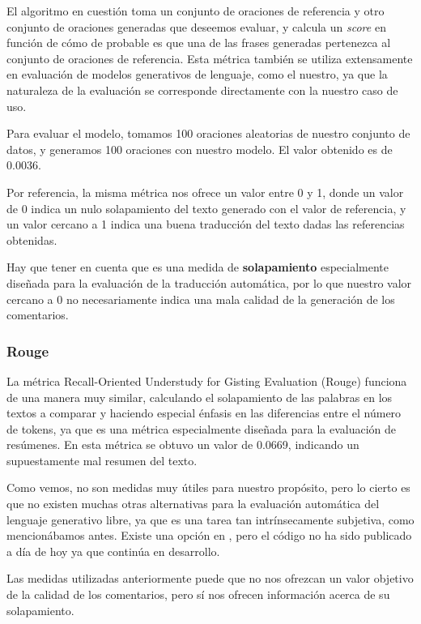 El algoritmo en cuestión toma un conjunto de oraciones de referencia y otro conjunto de oraciones generadas que deseemos evaluar, y calcula un \textit{score} en función de cómo de probable es que una de las frases generadas pertenezca al conjunto de oraciones de referencia. Esta métrica también se utiliza extensamente en evaluación de modelos generativos de lenguaje, como el nuestro, ya que la naturaleza de la evaluación se corresponde directamente con la nuestro caso de uso.


Para evaluar el modelo, tomamos 100 oraciones aleatorias de nuestro conjunto de datos, y generamos 100 oraciones con nuestro modelo. El valor obtenido es de 0.0036. 

Por referencia, la misma métrica nos ofrece un valor entre 0 y 1, donde un valor de 0 indica un nulo solapamiento del texto generado con el valor de referencia, y un valor cercano a 1 indica una buena traducción del texto dadas las referencias obtenidas.

Hay que tener en cuenta que es una medida de \textbf{solapamiento} especialmente diseñada para la evaluación de la traducción automática, por lo que nuestro valor cercano a 0 no necesariamente indica una mala calidad de la generación de los comentarios.

\subsubsection{Rouge}
La métrica Recall-Oriented Understudy for Gisting Evaluation (Rouge) funciona de una manera muy similar, calculando el solapamiento de las palabras en los textos a comparar y haciendo especial énfasis en las diferencias entre el número de tokens, ya que es una métrica especialmente diseñada para la evaluación de resúmenes. En esta métrica se obtuvo un valor de 0.0669, indicando un supuestamente mal resumen del texto. 

\vspace{15mm}
Como vemos, no son medidas muy útiles para nuestro propósito, pero lo cierto es que no existen muchas otras alternativas para la evaluación automática del lenguaje generativo libre, ya que es una tarea tan intrínsecamente subjetiva, como mencionábamos antes. Existe una opción en \cite{yuan2021bartscore}, pero el código no ha sido publicado a día de hoy ya que continúa en desarrollo. 

Las medidas utilizadas anteriormente puede que no nos ofrezcan un valor objetivo de la calidad de los comentarios, pero sí nos ofrecen información acerca de su solapamiento.

